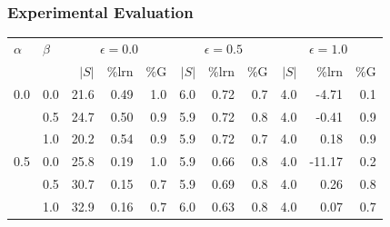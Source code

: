 \documentclass{beamer}
\begin{document}
\begin{frame}
\frametitle{Experimental Evaluation}

\begin{table}[t]\footnotesize
\centering
\def\toprule{\hline}
\def\midrule{\hline\hline}
\def\bottomrule{\hline}
\tabcolsep=3pt
\begin{tabular}{|l|l|r|r|r|r|r|r|r|r|r|}
\toprule
$\alpha$ & $\beta$ & 
\multicolumn{3}{|c|}{$\epsilon=0.0$} & 
\multicolumn{3}{|c|}{$\epsilon=0.5$} & 
\multicolumn{3}{|c|}{$\epsilon=1.0$} \\  \cline{3-11}
& & $|S|$ & \%lrn & \%G & 
$|S|$ & \%lrn & \%G & 
$|S|$ & \%lrn & \%G \\ \midrule
0.0 & 0.0 &          21.6 &        0.49 &           1.0 & 
                      6.0 &        0.72 &           0.7 & 
                      4.0 &       -4.71 &           0.1 \\
    & 0.5 &          24.7 &        0.50 &           0.9 & 
                      5.9 &        0.72 &           0.8 & 
                      4.0 &       -0.41 &           0.9 \\
    & 1.0 &          20.2 &        0.54 &           0.9 & 
                      5.9 &        0.72 &           0.7 & 
                      4.0 &        0.18 &           0.9 \\ 
0.5 & 0.0 &          25.8 &        0.19 &           1.0 & 
                      5.9 &        0.66 &           0.8 & 
                      4.0 &      -11.17 &           0.2 \\
    & 0.5 &          30.7 &        0.15 &           0.7 & 
                      5.9 &        0.69 &           0.8 & 
                      4.0 &        0.26 &           0.8 \\
    & 1.0 &          32.9 &        0.16 &           0.7 & 
                      6.0 &        0.63 &           0.8 & 
                      4.0 &        0.07 &           0.7 \\

\end{tabular}
\end{table}
\end{frame}
\end{document}
